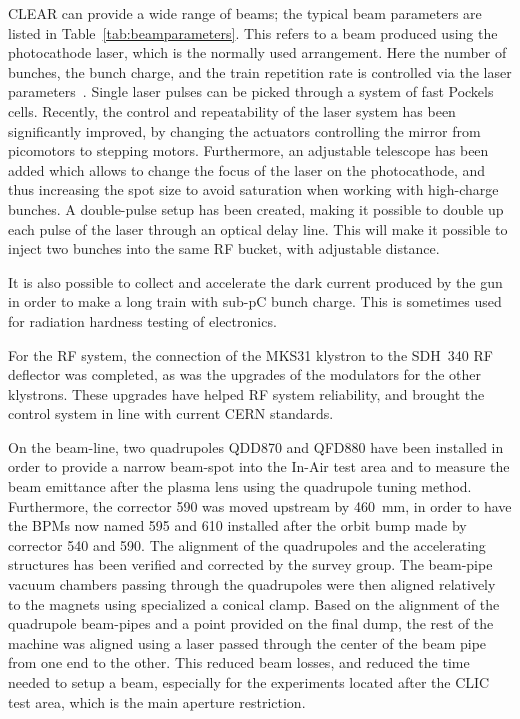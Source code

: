 \documentclass[a4paper,
               keeplastbox,   %
               ]{jacow}
\begin{document}
CLEAR can provide a wide range of beams; the typical beam parameters are listed in Table~\ref{tab:beamparameters}.
This refers to a beam produced using the photocathode laser, which is the normally used arrangement.
Here the number of bunches, the bunch charge, and the train repetition rate is controlled via the laser parameters~\cite{LucaGun,BrossardGun}.
Single laser pulses can be picked through a system of fast Pockels cells.
Recently, the control and repeatability of the laser system has been significantly improved, by changing the actuators controlling the mirror from picomotors to stepping motors.
Furthermore, an adjustable telescope has been added which allows to change the focus of the laser on the photocathode, and thus increasing the spot size to avoid saturation when working with high-charge bunches.
A double-pulse setup has been created, making it possible to double up each pulse of the laser through an optical delay line.
This will make it possible to inject two bunches into the same RF bucket, with adjustable distance.

It is also possible to collect and accelerate the dark current produced by the gun in order to make a long train with sub-pC bunch charge.
This is sometimes used for radiation hardness testing of electronics.

For the RF system, the connection of the MKS31 klystron to the SDH~340 RF deflector was completed, as was the upgrades of the modulators for the other klystrons.
These upgrades have helped RF system reliability, and brought the control system in line with current CERN standards.


On the beam-line, two quadrupoles QDD870 and QFD880 have been installed in order to provide a narrow beam-spot into the In-Air test area and to measure the beam emittance after the plasma lens using the quadrupole tuning method.
Furthermore, the corrector 590 was moved upstream by 460~mm, in order to have the BPMs now named 595 and 610 installed after the orbit bump made by corrector 540 and 590.
The alignment of the quadrupoles and the accelerating structures has been verified and corrected by the survey group.
The beam-pipe vacuum chambers passing through the quadrupoles were then aligned relatively to the magnets using specialized a conical clamp.
Based on the alignment of the quadrupole beam-pipes and a point provided on the final dump, the rest of the machine was aligned using a laser passed through the center of the beam pipe from one end to the other.
This reduced beam losses, and reduced the time needed to setup a beam, especially for the experiments located after the CLIC test area, which is the main aperture restriction.
\end{document}
